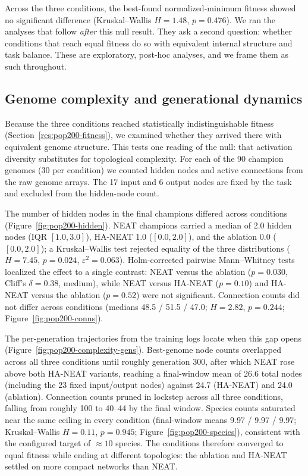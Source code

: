 \documentclass[12pt]{article}
\begin{document}
Across the three conditions, the best-found normalized-minimum fitness showed no significant
difference (Kruskal--Wallis $H = 1.48$, $p = 0.476$). We ran the analyses that follow
\emph{after} this null result. They ask a second question: whether conditions that reach equal
fitness do so with equivalent internal structure and task balance. These are exploratory, post-hoc
analyses, and we frame them as such throughout.
\label{res:pop200-fitness}

\subsection{Genome complexity and generational dynamics}
\label{sec:pop200-complexity}

Because the three conditions reached statistically indistinguishable fitness
(Section~\ref{res:pop200-fitness}), we examined whether they arrived there with equivalent genome
structure. This tests one reading of the null: that activation diversity substitutes for
topological complexity. For each of the 90 champion genomes (30 per condition) we counted hidden
nodes and active connections from the raw genome arrays. The 17 input and 6 output nodes are fixed
by the task and excluded from the hidden-node count.

The number of hidden nodes in the final champions differed across conditions
(Figure~\ref{fig:pop200-hidden}). NEAT champions carried a median of 2.0 hidden nodes
(IQR $[1.0, 3.0]$), HA-NEAT 1.0 ($[0.0, 2.0]$), and the ablation 0.0 ($[0.0, 2.0]$); a
Kruskal--Wallis test rejected equality of the three distributions ($H = 7.45$, $p = 0.024$,
$\varepsilon^2 = 0.063$). Holm-corrected pairwise Mann--Whitney tests localized the effect to a
single contrast: NEAT versus the ablation ($p = 0.030$, Cliff's $\delta = 0.38$, medium),
while NEAT versus HA-NEAT ($p = 0.10$) and HA-NEAT versus the ablation ($p = 0.52$) were not
significant. Connection counts did not differ across conditions (medians 48.5 / 51.5 / 47.0;
$H = 2.82$, $p = 0.244$; Figure~\ref{fig:pop200-conns}).

The per-generation trajectories from the training logs locate when this gap opens
(Figure~\ref{fig:pop200-complexity-gens}). Best-genome node counts overlapped across all three
conditions until roughly generation 300, after which NEAT rose above both HA-NEAT variants,
reaching a final-window mean of 26.6 total nodes (including the 23 fixed input/output nodes)
against 24.7 (HA-NEAT) and 24.0 (ablation). Connection counts pruned in lockstep across all three
conditions, falling from roughly 100 to 40--44 by the final window. Species counts saturated near
the same ceiling in every condition (final-window means 9.97 / 9.97 / 9.97; Kruskal--Wallis
$H = 0.11$, $p = 0.945$; Figure~\ref{fig:pop200-species}), consistent with the configured target of
$\approx 10$ species. The conditions therefore converged to equal fitness while ending at different
topologies: the ablation and HA-NEAT settled on more compact networks than NEAT.
\end{document}
